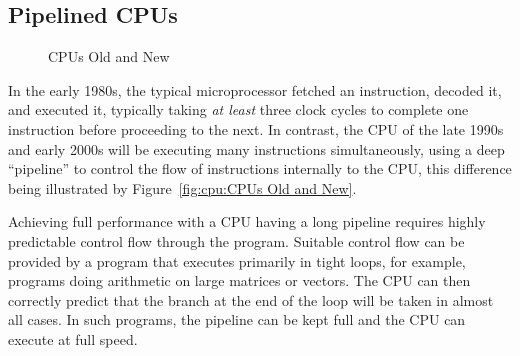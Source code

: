 \subsection{Pipelined CPUs}
\label{sec:cpu:Pipelined CPUs}

\begin{figure}[htb]
\begin{center}
\end{center}
\caption{CPUs Old and New}
\end{figure}

In the early 1980s, the typical microprocessor fetched an instruction,
decoded it, and executed it, typically taking \emph{at least} three
clock cycles to complete one instruction before proceeding to the next.
In contrast, the CPU of the late 1990s and early 2000s will be executing
many instructions simultaneously, using a deep ``pipeline'' to control
the flow of instructions internally to the CPU, this difference being
illustrated by Figure~\ref{fig:cpu:CPUs Old and New}.

Achieving full performance with a CPU having a long pipeline requires
highly predictable control flow through the program.
Suitable control flow can be provided by a program that executes primarily
in tight loops, for example, programs doing arithmetic on large matrices
or vectors.
The CPU can then correctly predict that the branch at the end of the loop
will be taken in almost all cases.
In such programs, the pipeline can be kept full and the CPU can execute
at full speed.

